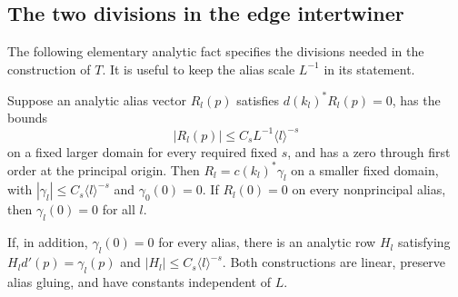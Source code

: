 \subsection{The two divisions in the edge intertwiner}

The following elementary analytic fact specifies the divisions needed
in the construction of $T$.  It is useful to keep the alias scale
$L^{-1}$ in its statement.

\begin{lemma}\label{app:alias-division}
Suppose an analytic alias vector $R_l(p)$ satisfies
$d(k_l)^*R_l(p)=0$, has the bounds
\[
 |R_l(p)|\le C_sL^{-1}\langle l\rangle^{-s}
\]
on a fixed larger domain for every required fixed $s$, and has a zero
through first order at the principal origin.  Then
$R_l=c(k_l)^*\gamma_l$ on a smaller fixed domain, with
$|\gamma_l|\le C_s\langle l\rangle^{-s}$ and
$\gamma_0(0)=0$.  If $R_l(0)=0$ on every nonprincipal alias, then
$\gamma_l(0)=0$ for all $l$.

If, in addition, $\gamma_l(0)=0$ for every alias, there is an
analytic row $H_l$ satisfying
$H_ld'(p)=\gamma_l(p)$ and
$|H_l|\le C_s\langle l\rangle^{-s}$.  Both constructions are linear,
preserve alias gluing, and have constants independent of $L$.
\end{lemma}

